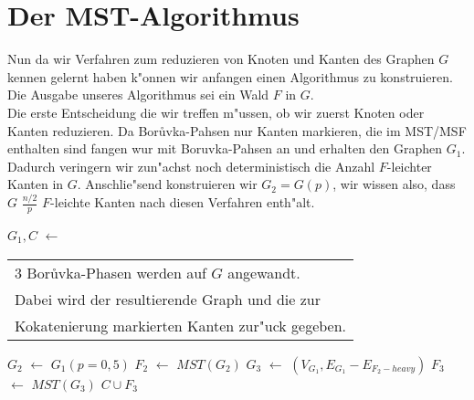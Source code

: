 \section{Der MST-Algorithmus}

Nun da wir Verfahren zum reduzieren von Knoten und Kanten des Graphen $G$ kennen
    gelernt haben  k"onnen wir anfangen einen Algorithmus zu konstruieren.
    Die Ausgabe unseres Algorithmus sei ein Wald $F$ in $G$.\\
Die erste Entscheidung die wir treffen m"ussen, ob wir zuerst Knoten oder Kanten
    reduzieren. Da Bor\r uvka-Pahsen nur Kanten markieren, die im MST/MSF 
    enthalten sind fangen wur mit Boruvka-Pahsen an und erhalten den Graphen 
    $G_1$.
    Dadurch veringern wir
    zun"achst noch deterministisch die Anzahl $F$-leichter Kanten in $G$.
    Anschlie"send konstruieren wir $G_2 = G(p)$, wir wissen also, dass $G$ 
    $\frac{n/2}{p}$ $F$-leichte Kanten nach diesen Verfahren enth"alt.\\
\begin{algorithm}
\begin{algorithmic}[1]
    \STATE $G_1, C$ $\leftarrow$\begin{tabular}[H]{l}
                                 3 Bor\r uvka-Phasen werden auf $G$ angewandt.\\
                                 Dabei wird der resultierende Graph und die zur\\
                                 Kokatenierung markierten Kanten zur"uck gegeben.
                                 \end{tabular}
    \STATE $G_2$ $\leftarrow$ $G_1(p=0,5)$
    \STATE $F_2$ $\leftarrow$ $MST(G_2)$
    \STATE $G_3$ $\leftarrow$ $(V_{G_1}, E_{G_1} - E_{F_2-heavy})$
    \STATE $F_3$ $\leftarrow$ $MST(G_3)$
    \RETURN $C \cup F_3$
\end{algorithmic}
\end{algorithm}
